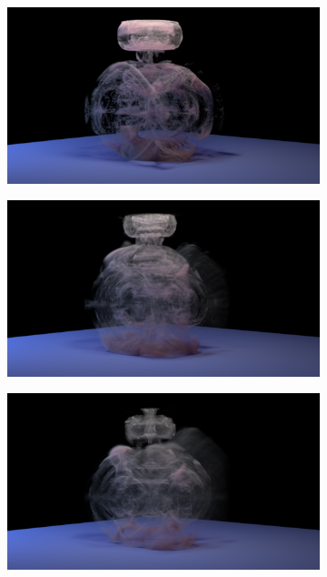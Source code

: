 \documentclass[11pt]{article}
\begin{document}
\begin{figure}
\begin{subfigure}[h]{0.5\textwidth}
	\end{subfigure}
	\begin{subfigure}[h]{0.5\textwidth}
		\centering
		\includegraphics[width=\textwidth]{Figures/renders/plume0014.png}
	\end{subfigure}
	\begin{subfigure}[h]{0.5\textwidth}
		\centering
		\includegraphics[width=\textwidth]{Figures/renders/plume0021.png}
	\end{subfigure}
	\begin{subfigure}[h]{0.5\textwidth}
		\centering
		\includegraphics[width=\textwidth]{Figures/renders/plume0030.png}

\end{subfigure}
\end{figure}
\end{document}
